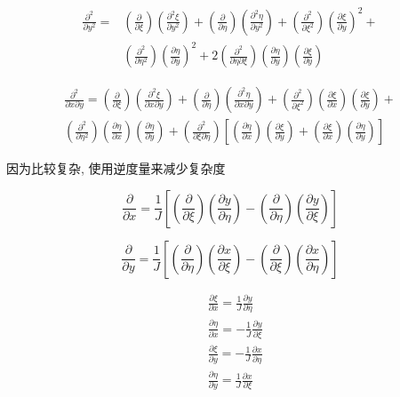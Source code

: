 \documentclass[UTF8]{ctexart}
\begin{document}
$$
	\begin{aligned}
		\frac{\partial^{2}}{\partial y^{2}}= & \left(\frac{\partial}{\partial \xi}\right)\left(\frac{\partial^{2} \xi}{\partial y^{2}}\right)+\left(\frac{\partial}{\partial \eta}\right)\left(\frac{\partial^{2} \eta}{\partial y^{2}}\right)+\left(\frac{\partial^{2}}{\partial \xi^{2}}\right)\left(\frac{\partial \xi}{\partial y}\right)^{2}+ \\
		                                     & \left(\frac{\partial^{2}}{\partial \eta^{2}}\right)\left(\frac{\partial \eta}{\partial y}\right)^{2}+2\left(\frac{\partial^{2}}{\partial \eta \partial \xi}\right)\left(\frac{\partial \eta}{\partial y}\right)\left(\frac{\partial \xi}{\partial y}\right)
	\end{aligned}
$$

$$
	\begin{aligned}
		\frac{\partial^{2}}{\partial x \partial y}=\left(\frac{\partial}{\partial \xi}\right)\left(\frac{\partial^{2} \xi}{\partial x \partial y}\right)+\left(\frac{\partial}{\partial \eta}\right)\left(\frac{\partial^{2} \eta}{\partial x \partial y}\right)+\left(\frac{\partial^{2}}{\partial \xi^{2}}\right)\left(\frac{\partial \xi}{\partial x}\right)\left(\frac{\partial \xi}{\partial y}\right)+ \\
		\left(\frac{\partial^{2}}{\partial \eta^{2}}\right)\left(\frac{\partial \eta}{\partial x}\right)\left(\frac{\partial \eta}{\partial y}\right)+\left(\frac{\partial^{2}}{\partial \xi \partial \eta}\right)\left[\left(\frac{\partial \eta}{\partial x}\right)\left(\frac{\partial \xi}{\partial y}\right)+\left(\frac{\partial \xi}{\partial x}\right)\left(\frac{\partial \eta}{\partial y}\right)\right]
	\end{aligned}
$$

因为比较复杂, 使用逆度量来减少复杂度

$$
	\frac{\partial}{\partial x}=\frac{1}{J}\left[\left(\frac{\partial}{\partial \xi}\right)\left(\frac{\partial y}{\partial \eta}\right)-\left(\frac{\partial}{\partial \eta}\right)\left(\frac{\partial y}{\partial \xi}\right)\right]
$$

$$
	\frac{\partial}{\partial y}=\frac{1}{J}\left[\left(\frac{\partial}{\partial \eta}\right)\left(\frac{\partial x}{\partial \xi}\right)-\left(\frac{\partial}{\partial \xi}\right)\left(\frac{\partial x}{\partial \eta}\right)\right]
$$

$$
	\begin{aligned}
		 & \frac{\partial \xi}{\partial x}=\frac{1}{J} \frac{\partial y}{\partial \eta}  \\
		 & \frac{\partial \eta}{\partial x}=-\frac{1}{J} \frac{\partial y}{\partial \xi} \\
		 & \frac{\partial \xi}{\partial y}=-\frac{1}{J} \frac{\partial x}{\partial \eta} \\
		 & \frac{\partial \eta}{\partial y}=\frac{1}{J} \frac{\partial x}{\partial \xi}
	\end{aligned}
$$
\end{document}
